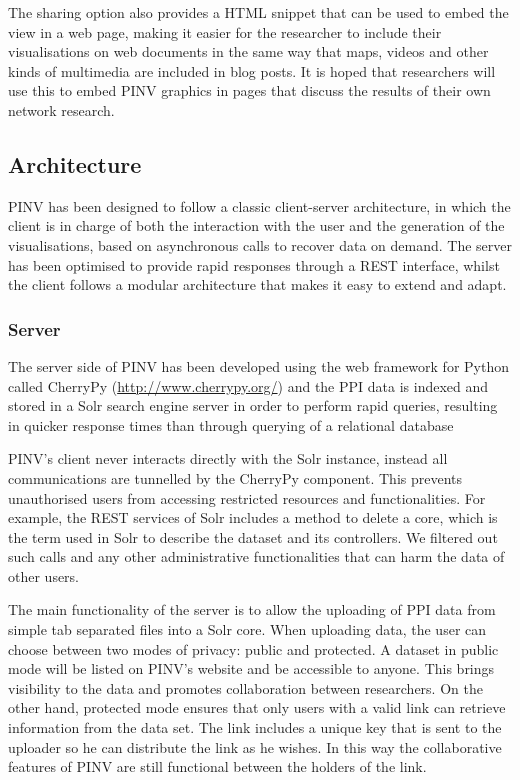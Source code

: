 The sharing option also provides a HTML snippet that can be used to embed the view in a web page, making it easier for the researcher to include their visualisations on web documents in the same way that maps, videos and other kinds of multimedia are included in blog posts. It is hoped that researchers will use this to embed PINV graphics in pages that discuss the results of their own network research.

\subsection{Architecture} \label{pinv_architecture}
PINV has been designed to follow a classic client-server architecture, in which the client is in charge of both the interaction with the user and the generation of the visualisations, based on asynchronous calls to recover data on demand. The server has been optimised to provide rapid responses through a REST interface, whilst the client follows a modular architecture that makes it easy to extend and adapt. 


\subsubsection{Server}
The server side of PINV has been developed using the web framework for Python called CherryPy (\url{http://www.cherrypy.org/}) and the PPI data is indexed and stored in a Solr search engine server \cite{KUC2013} in order to perform rapid queries, resulting in quicker response times than through querying of a relational database

PINV's client never interacts directly with the Solr instance, instead all communications are tunnelled by the CherryPy component.  This prevents unauthorised users from accessing restricted resources and functionalities. For example, the REST services of Solr includes a method to delete a core, which is the term used in Solr to describe the dataset and its controllers. We filtered out such calls and any other administrative functionalities that can harm the data of other users.

The main functionality of the server is to allow the uploading of PPI data from simple tab separated files into a Solr core. When uploading data, the user can choose between two modes of privacy: public and protected. A dataset in public mode will be listed on PINV’s website and be accessible to anyone. This brings visibility to the data and promotes collaboration between researchers. On the other hand, protected mode ensures that only users with a valid link can retrieve information from the data set. The link includes a unique key that is sent to the uploader so he can distribute the link as he wishes. In this way the collaborative features of PINV are still functional between the holders of the link.

